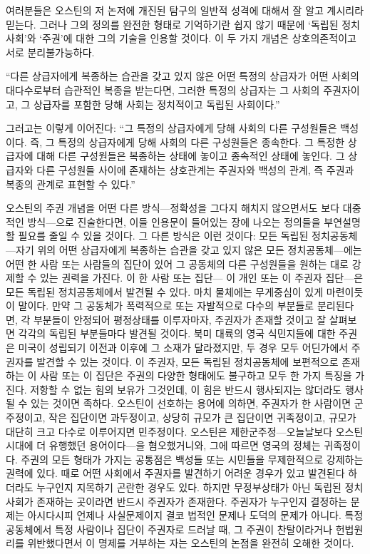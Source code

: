 여러분들은 오스틴의 저 논저에 개진된 탐구의 일반적 성격에 대해서
잘 알고 계시리라 믿는다.
그러나 그의 정의를 완전한 형태로 기억하기란 쉽지 않기 때문에
`독립된 정치사회'와 `주권'에 대한 그의 기술을 인용할 것이다.
이 두 가지 개념은 상호의존적이고 서로 분리불가능하다.

``다른 상급자에게 복종하는 습관을 갖고 있지 않은
어떤 특정의 상급자가
어떤 사회의 대다수로부터 습관적인 복종을 받는다면,
그러한 특정의 상급자는 그 사회의 주권자이고,
그 상급자를 포함한 당해 사회는 정치적이고 독립된 사회이다.''

그러고는 이렇게 이어진다:
``그 특정의 상급자에게 당해 사회의 다른 구성원들은
백성이다. 즉, 그 특정의 상급자에게 당해 사회의 다른 구성원들은
종속한다. 그 특정한 상급자에 대해 다른 구성원들은
복종하는 상태에 놓이고 종속적인 상태에 놓인다.
그 상급자와 다른 구성원들 사이에 존재하는 상호관계는
주권자와 백성의 관계, 즉 주권과 복종의 관계로 표현할 수 있다.''

오스틴의 주권 개념을 어떤 다른 방식---정확성을 그다지 해치지 않으면서도
보다 대중적인 방식---으로 진술한다면,
이들 인용문이 들어있는 장에 나오는 정의들을 부연설명할
필요를 줄일 수 있을 것이다.
그 다른 방식은 이런 것이다:
모든 독립된 정치공동체---자기 위의 어떤 상급자에게 복종하는 습관을
갖고 있지 않은 모든 정치공동체---에는
어떤 한 사람 또는 사람들의 집단이 있어 그 공동체의 다른 구성원들을
원하는 대로 강제할 수 있는 권력을 가진다.
이 한 사람 또는 집단--- 이 개인 또는
이 주권자 집단---은 모든 독립된 정치공동체에서
발견될 수 있다.
마치 물체에는 무게중심이 있게 마련이듯이 말이다.
만약 그 공동체가 폭력적으로 또는 자발적으로
다수의 부분들로 분리된다면,
각 부분들이 안정되어
평정상태를 이루자마자, 주권자가 존재할 것이고
잘 살펴보면
각각의 독립된 부분들마다 발견될 것이다.
북미 대륙의 영국 식민지들에 대한 주권은 미국이 성립되기 이전과 이후에
그 소재가 달라졌지만, 두 경우 모두 어딘가에서 주권자를 발견할 수 있는 것이다.
이 주권자, 모든
독립된 정치공동체에 보편적으로 존재하는 이 사람 또는 이 집단은
주권의 다양한 형태에도 불구하고
모두 한 가지 특징을 가진다. 저항할 수 없는 힘의 보유가 그것인데,
이 힘은 반드시 행사되지는 않더라도 행사될 수 있는 것이면 족하다.
오스틴이 선호하는 용어에 의하면,
주권자가 한 사람이면 군주정이고, 작은 집단이면 과두정이고,
상당히 규모가 큰 집단이면 귀족정이고,
규모가 대단히 크고 다수로 이루어지면 민주정이다.
오스틴은 제한군주정---오늘날보다 오스틴 시대에 더 유행했던 용어이다---을
혐오했거니와, 그에 따르면 영국의 정체는 귀족정이다.
주권의 모든 형태가 가지는 공통점은 백성들 또는 시민들을
무제한적으로 강제하는
권력에 있다.
때로 어떤 사회에서 주권자를 발견하기 어려운 경우가 있고
발견된다 하더라도 누구인지 지목하기 곤란한 경우도 있다.
하지만 무정부상태가 아닌 독립된 정치사회가 존재하는 곳이라면
반드시 주권자가 존재한다.
주권자가 누구인지 결정하는 문제는 아시다시피 언제나 사실문제이지 결코
법적인 문제나 도덕의 문제가 아니다.
특정 공동체에서 특정 사람이나 집단이 주권자로 드러날 때,
그 주권이 찬탈이라거나 헌법원리를 위반했다면서 이 명제를 거부하는 자는
오스틴의 논점을 완전히 오해한 것이다.

